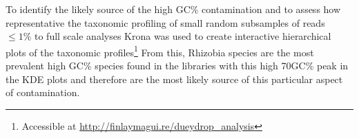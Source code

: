 \begin{table}[h!]

    \caption[Taxonomic Profiles of Bulk Libraries]{Taxonomic profile of the two trimmed (Q20) bulk transcriptome libraries generated using ``DueyDrop''.
All values are the percentage of reads mapping to that taxonomic category +/- the standard deviation between sampling replicates.  
The analysis was conducted for both forward and reverse reads from each library (indicated as R1 and R2 in the paired-end (PE) column).
Overall only a very small number of bulk reads could be assigned to any taxonomic class by ``DueyDrop''.}
    \label{tab:bulk_duey}
\end{table}

To identify the likely source of the high GC\% contamination 
and to assess how representative the taxonomic profiling of small random
subsamples of reads \(\leq1\%\) to full scale analyses Krona was used to 
create interactive hierarchical plots of the taxonomic profiles\footnote{
Accessible at \url{http://finlaymagui.re/dueydrop_analysis}} 
From this, Rhizobia species are the most prevalent high GC\% species found in the libraries
with this high 70GC\% peak in the KDE plots and therefore are the most likely source
of this particular aspect of contamination. 

